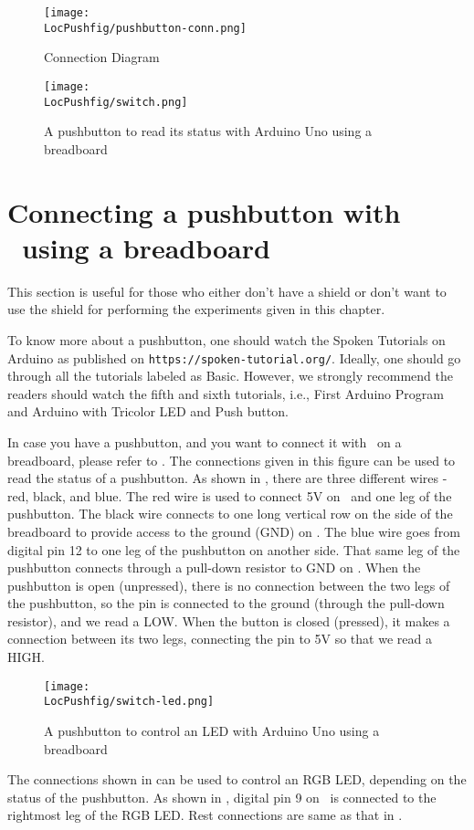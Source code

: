 \begin{figure}
\centering
\texttt{[image: \\LocPushfig/pushbutton-conn.png]}
\caption{Connection Diagram}
\label{fig:pushbuttonconn}
\end{figure}


\begin{figure}
  \centering
  \texttt{[image: \\LocPushfig/switch.png]}
  \caption{A pushbutton to read its status with Arduino Uno using a breadboard}
  \label{fig:switch-bread}
\end{figure}

\section{Connecting a pushbutton with \arduino\ using a breadboard}
This section is useful for those who either don't have a shield or don't want to use the shield
for performing the experiments given in this chapter. 

To know more about a pushbutton, one should watch the Spoken Tutorials on Arduino as published on 
  {\tt https://spoken-tutorial.org/}. Ideally, one should go through all the
tutorials labeled as Basic. However, we strongly recommend the readers should
watch the fifth and sixth tutorials, i.e., First Arduino Program and 
Arduino with Tricolor LED and Push button.

In case you have a pushbutton, and you want to connect it with \arduino\ on a breadboard, 
please refer to . The connections given in this figure can be used to 
read the status of a pushbutton. As shown in , 
there are three different wires - red, black, and blue. The red wire is used to connect 5V on 
\arduino\ and one leg of the pushbutton. The black wire connects to one long vertical row on 
the side of the breadboard to provide access to the ground (GND) on \arduino. 
The blue wire goes from digital pin 12 to one leg of the pushbutton on another side. 
That same leg of the pushbutton connects through a pull-down resistor to GND on \arduino. 
When the pushbutton is open (unpressed), there is no connection between the two legs of the pushbutton, 
so the pin is connected to the ground (through the pull-down resistor), and we read a LOW. 
When the button is closed (pressed), it makes a connection between its two legs, 
connecting the pin to 5V so that we read a HIGH.

\begin{figure}
  \centering
  \texttt{[image: \\LocPushfig/switch-led.png]}
  \caption{A pushbutton to control an LED with Arduino Uno using a breadboard}
  \label{fig:switch-led}
\end{figure}
The connections shown in  can be used to control an RGB LED, 
depending on the status of the pushbutton. As shown in , digital
pin 9 on \arduino\ is connected to the rightmost leg of the RGB LED. Rest connections
are same as that in . 

